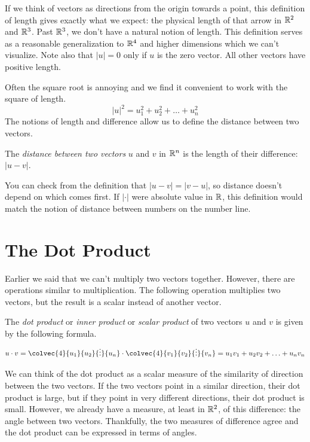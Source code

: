 \documentclass[fleqn,letterpaper]{report}
\begin{document}
If we think of vectors as directions from the origin towards a
point, this definition of length gives exactly what we expect:
the physical length of that arrow in $\mathbb{R}^2$ and $\mathbb{R}^3$.
Past $\mathbb{R}^3$, we don't have a natural notion of length. This
definition serves as a reasonable generalization
to $\mathbb{R}^4$ and higher dimensions which we can't
visualize. Note also that $|u| = 0$ only if $u$ is the zero
vector. All other vectors have positive length.

Often the square root is annoying and we find it convenient to
work with the square of length. 
\begin{equation*}
|u|^2 = u_1^2 + u_2^2 + \ldots + u_n^2
\end{equation*}
The notions of length and difference allow us to define the distance
between two vectors.

\begin{defn}
The \emph{distance between two vectors} $u$ and $v$ in $\mathbb{R}^n$
is the length of their difference: $|u-v|$.
\end{defn}

You can check from the definition that $|u-v| = |v-u|$, so
distance doesn't depend on which comes first. If $|\cdot|$ were
absolute value in $\mathbb{R}$, this definition would match the notion
of distance between numbers on the number line. 

\section{The Dot Product}
\label{dot-product}

Earlier we said that we can't multiply two vectors together.
However, there are operations similar to multiplication. The
following operation multiplies two vectors, but the result is
a scalar instead of another vector.

\begin{defn}
The \emph{dot product} or \emph{inner product} or \emph{scalar
product} of two vectors $u$ and $v$ is given by the following formula.
\begin{equation*}
u \cdot v = \colvec{4}{u_1}{u_2}{\vdots}{u_n} \cdot
\colvec{4}{v_1}{v_2}{\vdots}{v_n} = u_1 v_1 + u_2 v_2 + \ldots
+ u_n v_n
\end{equation*}
\end{defn}

We can think of the dot product as a scalar measure of the
similarity of direction between the two vectors. If the two
vectors point in a similar direction, their dot product is
large, but if they point in very different directions, their
dot product is small. However, we already have a measure, at
least in $\mathbb{R}^2$, of this difference: the angle between two
vectors. Thankfully, the two measures of difference agree and
the dot product can be expressed in terms of angles.
\end{document}

